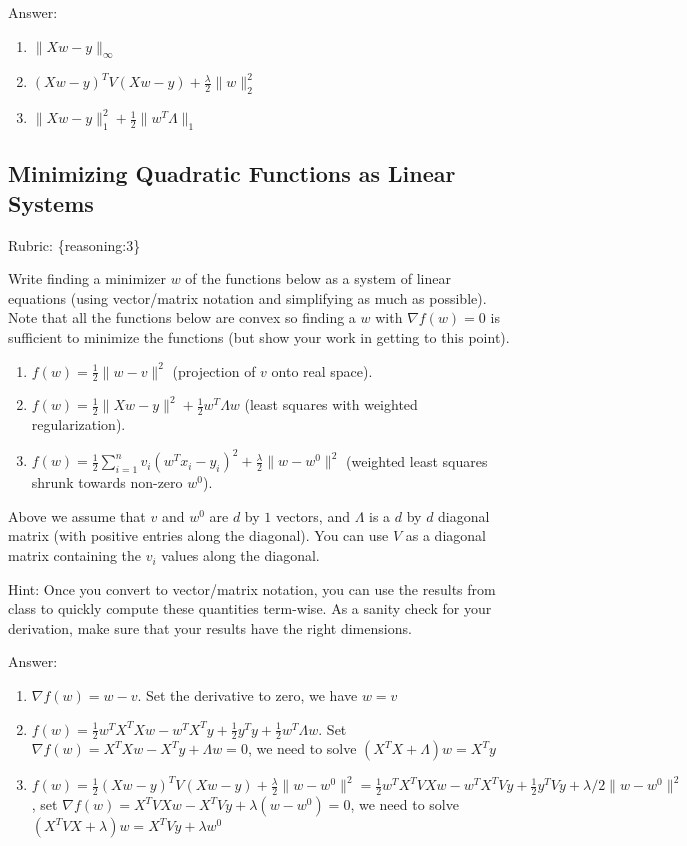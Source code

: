 \documentclass{article}
\def\rubric#1{\gre{Rubric: \{#1\}}}{}
\def\blu#1{{\color{blu}#1}}
\def\gre#1{{\color{gre}#1}}
\def\norm#1{\|#1\|}
\def\enum#1{\begin{enumerate}#1\end{enumerate}}
\begin{document}
\gre{Answer:
\begin{enumerate}
    \item $\parallel Xw- y\parallel_{\infty}$
    \item $(Xw-y)^TV(Xw-y)+ \frac{\lambda}{2}\parallel w\parallel_2^2$
    \item $\parallel Xw-y\parallel_1^2 + \frac{1}{2}\parallel w^T\Lambda\parallel _1$
\end{enumerate}
}
\subsection{Minimizing Quadratic Functions as Linear Systems}
\rubric{reasoning:3}

Write finding a minimizer $w$ of the functions below as a system of linear equations (using vector/matrix notation and simplifying as much as possible). Note that all the functions below are convex  so finding a $w$ with $\nabla f(w) = 0$ is sufficient to minimize the functions (but show your work in getting to this point).

\blu{\enum{
\item $f(w) = \frac{1}{2}\norm{w-v}^2$ (projection of $v$ onto real space).
\item $f(w)= \frac{1}{2}\norm{Xw - y}^2 + \frac{1}{2}w^T\Lambda w$ (least squares with weighted regularization).
\item $f(w) = \frac{1}{2}\sum_{i=1}^n v_i (w^Tx_i - y_i)^2 + \frac{\lambda}{2}\norm{w-w^0}^2$ (weighted least squares shrunk towards non-zero $w^0$).
}}
Above we assume that $v$ and $w^0$ are $d$ by $1$ vectors, and $\Lambda$ is a $d$ by $d$ diagonal matrix (with positive entries along the diagonal). You can use $V$ as a diagonal matrix containing the $v_i$ values along the diagonal.

Hint: Once you convert to vector/matrix notation, you can use the results from class to quickly compute these quantities term-wise.
As a sanity check for your derivation, make sure that your results have the right dimensions.

\gre{Answer:
\begin{enumerate}
    \item $\nabla f(w) = w-v$. Set the derivative to zero, we have $w = v$
    \item $f(w) = \frac{1}{2}w^TX^TXw-w^TX^Ty+\frac{1}{2}y^Ty+\frac{1}{2}w^T\Lambda w$. Set $\nabla f(w) = X^TXw-X^Ty +\Lambda w = 0$, we need to solve $(X^TX+\Lambda)w = X^Ty$
    \item $f(w) = \frac{1}{2}(Xw-y)^TV(Xw-y)+\frac{\lambda}{2}\norm{w-w^0}^2= \frac{1}{2}w^TX^TVXw-w^TX^TVy+\frac{1}{2}y^TVy+\lambda/2\norm{w-w^0}^2$, set $\nabla f(w) = X^TVXw - X^TVy + \lambda(w-w^0)= 0$, we need to solve $(X^TVX+\lambda)w = X^TVy+\lambda w^0$
\end{enumerate}
}
\end{document}
